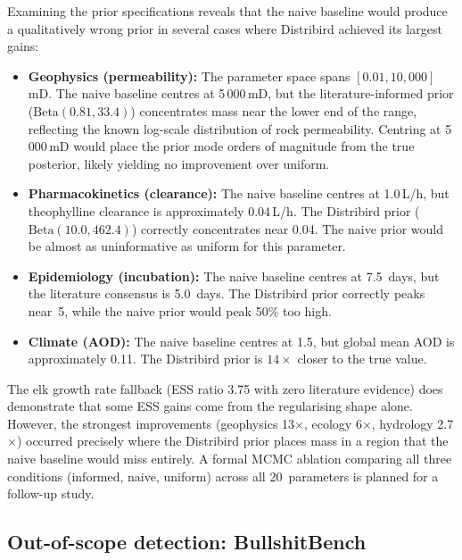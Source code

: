\documentclass[11pt,a4paper]{article}
\begin{document}
Examining the prior specifications reveals that the naive baseline would produce a qualitatively wrong prior in several cases where Distribird achieved its largest gains:

\begin{itemize}
  \item \textbf{Geophysics (permeability):} The parameter space spans $[0.01, 10{,}000]$\,mD. The naive baseline centres at 5\,000\,mD, but the literature-informed prior ($\mathrm{Beta}(0.81, 33.4)$) concentrates mass near the lower end of the range, reflecting the known log-scale distribution of rock permeability. Centring at 5\,000\,mD would place the prior mode orders of magnitude from the true posterior, likely yielding no improvement over uniform.

  \item \textbf{Pharmacokinetics (clearance):} The naive baseline centres at 1.0\,L/h, but theophylline clearance is approximately 0.04\,L/h. The Distribird prior ($\mathrm{Beta}(10.0, 462.4)$) correctly concentrates near 0.04. The naive prior would be almost as uninformative as uniform for this parameter.

  \item \textbf{Epidemiology (incubation):} The naive baseline centres at 7.5~days, but the literature consensus is 5.0~days. The Distribird prior correctly peaks near~5, while the naive prior would peak 50\% too high.

  \item \textbf{Climate (AOD):} The naive baseline centres at 1.5, but global mean AOD is approximately 0.11. The Distribird prior is $14\times$ closer to the true value.
\end{itemize}

\noindent The elk growth rate fallback (ESS ratio 3.75 with zero literature evidence) does demonstrate that some ESS gains come from the regularising shape alone. However, the strongest improvements (geophysics 13$\times$, ecology 6$\times$, hydrology 2.7$\times$) occurred precisely where the Distribird prior places mass in a region that the naive baseline would miss entirely. A formal MCMC ablation comparing all three conditions (informed, naive, uniform) across all 20~parameters is planned for a follow-up study.

\subsection{Out-of-scope detection: BullshitBench}
\label{sec:bullshitbench-eval}
\end{document}
